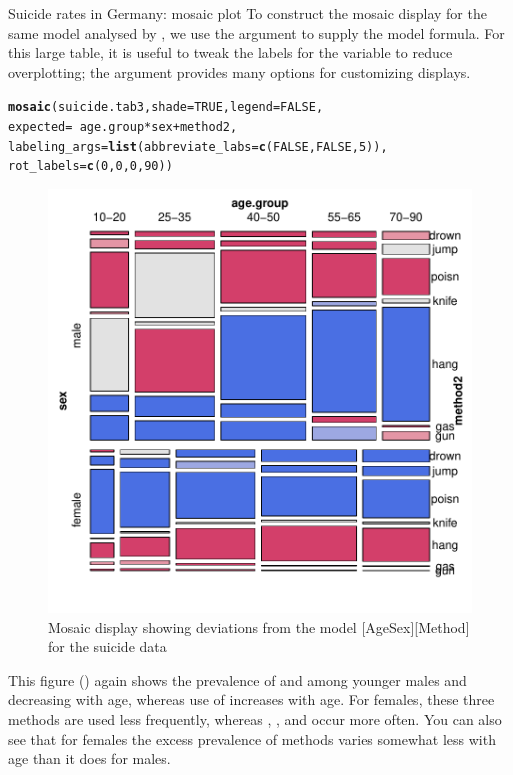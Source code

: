 \documentclass[11pt]{book}\usepackage[]{graphicx}\usepackage[]{color}
\makeatletter
\newcommand{\hlnum}[1]{\textcolor[rgb]{0.686,0.059,0.569}{#1}}%
\newcommand{\hlopt}[1]{\textcolor[rgb]{0,0,0}{#1}}%
\newcommand{\hlstd}[1]{\textcolor[rgb]{0.345,0.345,0.345}{#1}}%
\newcommand{\hlkwc}[1]{\textcolor[rgb]{0.333,0.667,0.333}{#1}}%
\newcommand{\hlkwd}[1]{\textcolor[rgb]{0.737,0.353,0.396}{\textbf{#1}}}%
\newenvironment{kframe}{%
 \def\at@end@of@kframe{}%
 \ifinner\ifhmode%
  \def\at@end@of@kframe{\end{minipage}}%
  \begin{minipage}{\columnwidth}%
 \fi\fi%
 \def\FrameCommand##1{\hskip\@totalleftmargin \hskip-\fboxsep
 \colorbox{shadecolor}{##1}\hskip-\fboxsep
     \hskip-\linewidth \hskip-\@totalleftmargin \hskip\columnwidth}%
 \MakeFramed {\advance\hsize-\width
   \@totalleftmargin\z@ \linewidth\hsize
   \@setminipage}}%
 {\par\unskip\endMakeFramed%
 \at@end@of@kframe}
\newenvironment{knitrout}{}{} %
\renewenvironment{knitrout}{\small\renewcommand{\baselinestretch}{.85}}{} %
\makeatother
\begin{document}
\begin{Example}[suicide2]{Suicide rates in Germany: mosaic plot}
To construct the mosaic display for the same model analysed by \ca, we use the 
argument  to supply the model formula.
For this large table, it is useful to tweak the labels for the 
variable to reduce overplotting; the  argument provides
many options for customizing  displays.
\begin{knitrout}
\color{fgcolor}\begin{kframe}
\begin{alltt}
\hlkwd{mosaic}\hlstd{(suicide.tab3,} \hlkwc{shade}\hlstd{=}\hlnum{TRUE}\hlstd{,} \hlkwc{legend}\hlstd{=}\hlnum{FALSE}\hlstd{,}
       \hlkwc{expected}\hlstd{=}\hlopt{~}\hlstd{age.group}\hlopt{*}\hlstd{sex} \hlopt{+} \hlstd{method2,}
       \hlkwc{labeling_args}\hlstd{=}\hlkwd{list}\hlstd{(}\hlkwc{abbreviate_labs}\hlstd{=}\hlkwd{c}\hlstd{(}\hlnum{FALSE}\hlstd{,} \hlnum{FALSE}\hlstd{,} \hlnum{5}\hlstd{)),}
                          \hlkwc{rot_labels} \hlstd{=} \hlkwd{c}\hlstd{(}\hlnum{0}\hlstd{,} \hlnum{0}\hlstd{,} \hlnum{0}\hlstd{,} \hlnum{90}\hlstd{))}
\end{alltt}
\end{kframe}\begin{figure}[htbp]


\centerline{\includegraphics[width=.7\textwidth]{ch06/fig/ca-suicide-mosaic} }

\caption[Mosaic display showing deviations from the model AgeSex Method for the suicide data]{Mosaic display showing deviations from the model [AgeSex][Method] for the suicide data\label{fig:ca-suicide-mosaic}}
\end{figure}


\end{knitrout}

This figure ()
again shows the prevalence of  and
 among younger males and decreasing with age, whereas use of 
increases with age.  
For females, these three methods are used less
frequently, whereas , , and  occur more often.
You can also see that for females the excess prevalence of methods varies somewhat
less with age than it does for males.

\end{Example}
\end{document}
